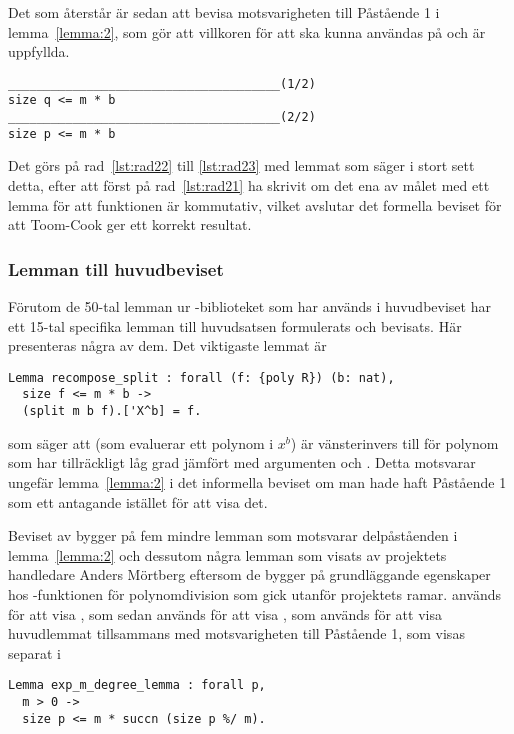 Det som återstår är sedan att bevisa motsvarigheten till Påstående 1 i
lemma~\ref{lemma:2}, som gör att villkoren för att  ska
kunna användas på  och  är uppfyllda.
\begin{lstlisting}
______________________________________(1/2)
size q <= m * b
______________________________________(2/2)
size p <= m * b
\end{lstlisting}
Det görs på rad~\ref{lst:rad22} till \ref{lst:rad23} med lemmat
 som säger i stort sett detta, efter att först på
rad~\ref{lst:rad21} ha skrivit om det ena av målet med ett lemma för att
funktionen  är kommutativ, vilket avslutar det formella beviset för
att Toom-Cook ger ett korrekt resultat.

\subsubsection{Lemman till huvudbeviset}
Förutom de 50-tal lemman ur \ssr{}-biblioteket som har används i huvudbeviset har
ett 15-tal specifika lemman till huvudsatsen formulerats och bevisats. Här
presenteras några av dem. Det viktigaste lemmat är
\begin{lstlisting}
Lemma recompose_split : forall (f: {poly R}) (b: nat),
  size f <= m * b ->
  (split m b f).['X^b] = f.
\end{lstlisting}
som säger att  (som evaluerar ett polynom i $x^b$) är
vänsterinvers till  för polynom som har tillräckligt låg grad jämfört
med argumenten  och . Detta motsvarar ungefär lemma~\ref{lemma:2} i
det informella beviset om man hade haft Påstående 1 som ett antagande istället
för att visa det.

Beviset av  bygger på fem mindre lemman som motsvarar
delpåståenden i lemma~\ref{lemma:2} och dessutom några lemman som visats av
projektets handledare Anders Mörtberg eftersom de bygger på grundläggande
egenskaper hos \ssr{}-funktionen  för polynomdivision som gick utanför
projektets ramar.
 används för att visa , som
sedan används för att visa , som används för att visa
huvudlemmat tillsammans med motsvarigheten till Påstående 1, som visas separat
i
\begin{lstlisting}
Lemma exp_m_degree_lemma : forall p,
  m > 0 ->
  size p <= m * succn (size p %/ m).
\end{lstlisting}

